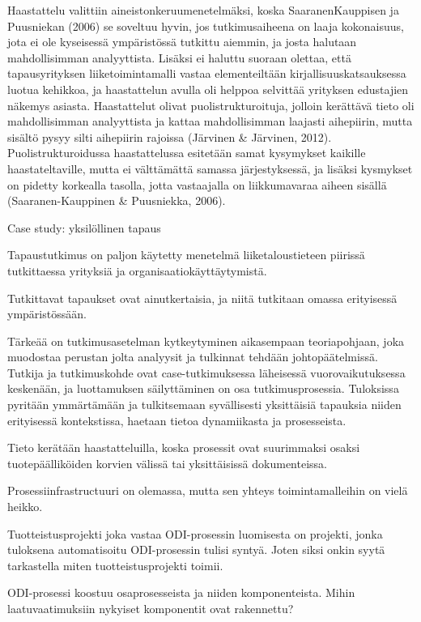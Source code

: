 \documentclass[finnish,12pt,a4paper,pdftex]{article}
\begin{document}
Haastattelu valittiin aineistonkeruumenetelmäksi, koska SaaranenKauppisen
ja Puusniekan (2006) se soveltuu hyvin, jos tutkimusaiheena on laaja
kokonaisuus, jota ei ole kyseisessä ympäristössä tutkittu aiemmin, ja josta
halutaan mahdollisimman analyyttista. Lisäksi ei haluttu suoraan olettaa, että
tapausyrityksen liiketoimintamalli vastaa elementeiltään
kirjallisuuskatsauksessa luotua kehikkoa, ja haastattelun avulla oli helppoa
selvittää yrityksen edustajien näkemys asiasta. Haastattelut olivat
puolistrukturoituja, jolloin kerättävä tieto oli mahdollisimman analyyttista ja
kattaa mahdollisimman laajasti aihepiirin, mutta sisältö pysyy silti aihepiirin
rajoissa (Järvinen & Järvinen, 2012). Puolistrukturoidussa haastattelussa
esitetään samat kysymykset kaikille haastateltaville, mutta ei välttämättä
samassa järjestyksessä, ja lisäksi kysmykset on pidetty korkealla tasolla, jotta
vastaajalla on liikkumavaraa aiheen sisällä (Saaranen-Kauppinen & Puusniekka,
2006). 

Case study: yksilöllinen tapaus

Tapaustutkimus on paljon käytetty menetelmä liiketaloustieteen piirissä tutkittaessa yrityksiä ja organisaatiokäyttäytymistä.

Tutkittavat tapaukset ovat ainutkertaisia, ja niitä tutkitaan omassa erityisessä ympäristössään.

Tärkeää on tutkimusasetelman kytkeytyminen aikasempaan teoriapohjaan, joka muodostaa perustan jolta analyysit ja tulkinnat tehdään johtopäätelmissä.
Tutkija ja tutkimuskohde ovat case-tutkimuksessa läheisessä vuorovaikutuksessa keskenään, ja luottamuksen säilyttäminen on osa tutkimusprosessia. Tuloksissa pyritään ymmärtämään ja tulkitsemaan syvällisesti yksittäisiä tapauksia niiden erityisessä kontekstissa, haetaan tietoa dynamiikasta ja prosesseista.

Tieto kerätään haastatteluilla, koska prosessit ovat suurimmaksi osaksi tuotepäälliköiden korvien välissä tai yksittäisissä dokumenteissa.

Prosessiinfrastructuuri on olemassa, mutta sen yhteys toimintamalleihin on vielä heikko. 

Tuotteistusprojekti joka vastaa ODI-prosessin luomisesta on projekti, jonka tuloksena automatisoitu ODI-prosessin tulisi syntyä. Joten siksi onkin syytä tarkastella miten tuotteistusprojekti toimii.


ODI-prosessi koostuu osaprosesseista ja niiden komponenteista. Mihin laatuvaatimuksiin nykyiset komponentit ovat rakennettu?
\end{document}
